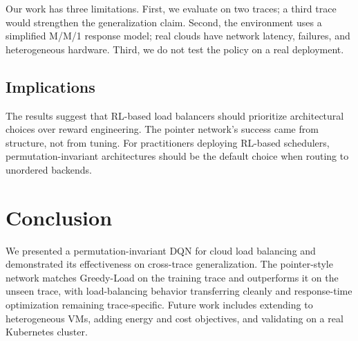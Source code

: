 \documentclass[conference]{IEEEtran}
\begin{document}
Our work has three limitations. First, we evaluate on two traces; a third trace would strengthen the generalization claim. Second, the environment uses a simplified M/M/1 response model; real clouds have network latency, failures, and heterogeneous hardware. Third, we do not test the policy on a real deployment.

\subsection{Implications}

The results suggest that RL-based load balancers should prioritize architectural choices over reward engineering. The pointer network's success came from structure, not from tuning. For practitioners deploying RL-based schedulers, permutation-invariant architectures should be the default choice when routing to unordered backends.

\section{Conclusion}

We presented a permutation-invariant DQN for cloud load balancing and demonstrated its effectiveness on cross-trace generalization. The pointer-style network matches Greedy-Load on the training trace and outperforms it on the unseen trace, with load-balancing behavior transferring cleanly and response-time optimization remaining trace-specific. Future work includes extending to heterogeneous VMs, adding energy and cost objectives, and validating on a real Kubernetes cluster.
\end{document}
